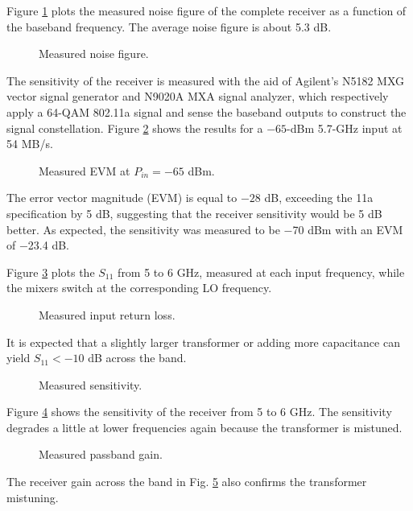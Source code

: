 Figure \ref{nf} plots the measured noise figure of the complete receiver as a function of the baseband frequency. The average noise figure is about
5.3 dB.
\begin{figure}[htb]
\vspace{2.4507in}
\caption{Measured noise figure.}
\label{nf}
\end{figure}
The sensitivity of the receiver is measured with the aid of Agilent's N5182 MXG vector signal generator and N9020A MXA signal analyzer, which
respectively apply a 64-QAM 802.11a signal and sense the baseband outputs to construct the signal constellation. Figure \ref{constel} shows the
results for a $-65$-dBm 5.7-GHz input at 54 MB/s.
\begin{figure}[htb]
\vspace{2.6in}
\caption{Measured EVM at $P_{in}=-65$ dBm.}
\label{constel}
\end{figure}
The error vector magnitude (EVM) is equal to $-28$ dB, exceeding the 11a specification by 5 dB, suggesting that the receiver sensitivity would be 5 dB
better. As expected, the sensitivity was measured to be $-$70 dBm with an EVM of $-$23.4 dB.

Figure \ref{s11} plots the $S_{11}$ from 5 to 6 GHz, measured at each input frequency, while the mixers switch at the corresponding LO frequency.
\begin{figure}[htb]
\vspace{2.6in}
\caption{Measured input return loss.}
\label{s11}
\end{figure}
It is expected that a slightly larger transformer or adding more capacitance can yield $S_{11}<-10$ dB across the band.
\begin{figure}[htb]
\vspace{2.6in}
\caption{Measured sensitivity.}
\label{sensitivity}
\end{figure}
Figure \ref{sensitivity} shows the sensitivity of the receiver from 5 to 6 GHz. The sensitivity degrades a little at lower frequencies again because the
transformer is mistuned. 
\begin{figure}[htb]
\vspace{2.6in}
\caption{Measured passband gain.}
\label{gainvsf}
\end{figure}
The receiver gain across the band in Fig. \ref{gainvsf} also confirms the transformer mistuning.

